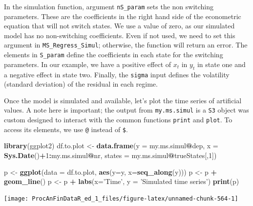 \documentclass[11pt,]{book}
\newenvironment{Shaded}{\begin{snugshade}}{\end{snugshade}}
\newcommand{\KeywordTok}[1]{\textcolor[rgb]{0.27,0.27,0.27}{\textbf{#1}}}
\newcommand{\DataTypeTok}[1]{\textcolor[rgb]{0.27,0.27,0.27}{#1}}
\newcommand{\DecValTok}[1]{\textcolor[rgb]{0.06,0.06,0.06}{#1}}
\newcommand{\StringTok}[1]{\textcolor[rgb]{0.5,0.5,0.5}{#1}}
\newcommand{\OperatorTok}[1]{\textcolor[rgb]{0.81,0.36,0.00}{\textbf{#1}}}
\newcommand{\NormalTok}[1]{#1}
\begin{document}
In the simulation function, argument \texttt{nS\_param} sets the non
switching parameters. These are the coefficients in the right hand side
of the econometric equation that will not switch states. We use a value
of zero, as our simulated model has no non-switching coefficients. Even
if not used, we need to set this argument in
\texttt{MS\_Regress\_Simul}; otherwise, the function will return an
error. The elements in \texttt{S\_param} define the coefficients in each
state for the switching parameters. In our example, we have a positive
effect of \(x_t\) in \(y_t\) in state one and a negative effect in state
two. Finally, the \texttt{sigma} input defines the volatility (standard
deviation) of the residual in each regime.

Once the model is simulated and available, let's plot the time series of
artificial values. A note here is important; the output from
\texttt{my.ms.simul} is a \texttt{S3} object was custom designed to
interact with the common functions \texttt{print} and \texttt{plot}. To
access its elements, we use \texttt{@} instead of \texttt{\$}.

\begin{Shaded}
\begin{Highlighting}[]
\KeywordTok{library}\NormalTok{(ggplot2)}
\NormalTok{df.to.plot <-}\StringTok{ }\KeywordTok{data.frame}\NormalTok{(}\DataTypeTok{y =}\NormalTok{ my.ms.simul}\OperatorTok{@}\NormalTok{dep, }
                         \DataTypeTok{x =} \KeywordTok{Sys.Date}\NormalTok{()}\OperatorTok{+}\DecValTok{1}\OperatorTok{:}\NormalTok{my.ms.simul}\OperatorTok{@}\NormalTok{nr,}
                         \DataTypeTok{states =}\NormalTok{ my.ms.simul}\OperatorTok{@}\NormalTok{trueStates[,}\DecValTok{1}\NormalTok{])}

\NormalTok{p <-}\StringTok{ }\KeywordTok{ggplot}\NormalTok{(}\DataTypeTok{data =}\NormalTok{ df.to.plot, }\KeywordTok{aes}\NormalTok{(}\DataTypeTok{y=}\NormalTok{y, }\DataTypeTok{x=}\KeywordTok{seq_along}\NormalTok{(y)))}
\NormalTok{p <-}\StringTok{ }\NormalTok{p }\OperatorTok{+}\StringTok{ }\KeywordTok{geom_line}\NormalTok{()}
\NormalTok{p <-}\StringTok{ }\NormalTok{p }\OperatorTok{+}\StringTok{ }\KeywordTok{labs}\NormalTok{(}\DataTypeTok{x=}\StringTok{'Time'}\NormalTok{, }\DataTypeTok{y =} \StringTok{'Simulated time series'}\NormalTok{)}
\KeywordTok{print}\NormalTok{(p)}
\end{Highlighting}
\end{Shaded}

\begin{center}\texttt{[image: ProcAnFinDataR\_ed\_1\_files/figure-latex/unnamed-chunk-564-1]} \end{center}
\end{document}
